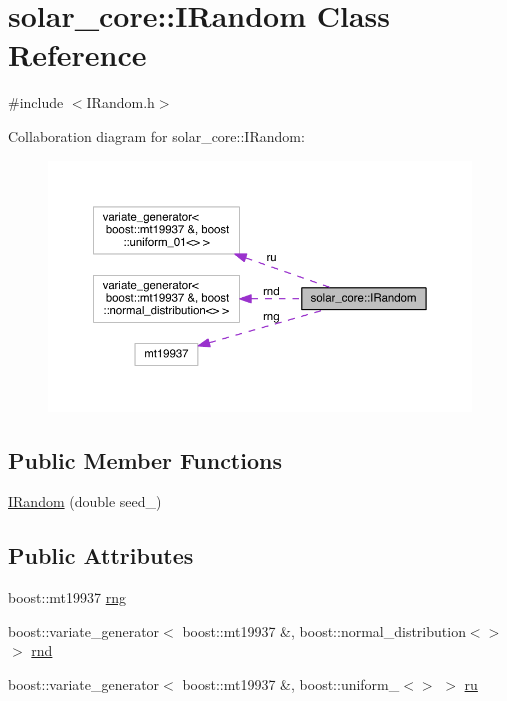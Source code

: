 \hypertarget{classsolar__core_1_1_i_random}{}\section{solar\+\_\+core\+:\+:I\+Random Class Reference}
\label{classsolar__core_1_1_i_random}


{\ttfamily \#include $<$I\+Random.\+h$>$}



Collaboration diagram for solar\+\_\+core\+:\+:I\+Random\+:
\nopagebreak
\begin{figure}[H]
\begin{center}
\leavevmode
\includegraphics[width=350pt]{classsolar__core_1_1_i_random__coll__graph}
\end{center}
\end{figure}
\subsection*{Public Member Functions}
\begin{DoxyCompactItemize}
\item 
\hyperlink{classsolar__core_1_1_i_random_a2d9a927aebfdeed274152871f7f66516}{I\+Random} (double seed\+\_\+)
\end{DoxyCompactItemize}
\subsection*{Public Attributes}
\begin{DoxyCompactItemize}
\item 
boost\+::mt19937 \hyperlink{classsolar__core_1_1_i_random_a5d02ddbfd7b3c7a2932166b9ddba5f02}{rng}
\item 
boost\+::variate\+\_\+generator$<$ boost\+::mt19937 \&, boost\+::normal\+\_\+distribution$<$$>$ $>$ \hyperlink{classsolar__core_1_1_i_random_a5a9593271657fe327d1e1ee1b456796c}{rnd}
\item 
boost\+::variate\+\_\+generator$<$ boost\+::mt19937 \&, boost\+::uniform\+\_$<$$>$ $>$ \hyperlink{classsolar__core_1_1_i_random_ab6a4ab724b521abecbcc87cd736edfd2}{ru}
\end{DoxyCompactItemize}


